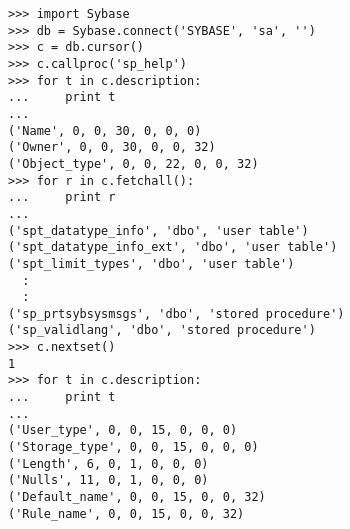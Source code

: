 \begin{verbatim}
>>> import Sybase
>>> db = Sybase.connect('SYBASE', 'sa', '')
>>> c = db.cursor()
>>> c.callproc('sp_help')
>>> for t in c.description:
...     print t
... 
('Name', 0, 0, 30, 0, 0, 0)
('Owner', 0, 0, 30, 0, 0, 32)
('Object_type', 0, 0, 22, 0, 0, 32)
>>> for r in c.fetchall():
...     print r
... 
('spt_datatype_info', 'dbo', 'user table')
('spt_datatype_info_ext', 'dbo', 'user table')
('spt_limit_types', 'dbo', 'user table')
  :
  :
('sp_prtsybsysmsgs', 'dbo', 'stored procedure')
('sp_validlang', 'dbo', 'stored procedure')
>>> c.nextset()
1
>>> for t in c.description:
...     print t
... 
('User_type', 0, 0, 15, 0, 0, 0)
('Storage_type', 0, 0, 15, 0, 0, 0)
('Length', 6, 0, 1, 0, 0, 0)
('Nulls', 11, 0, 1, 0, 0, 0)
('Default_name', 0, 0, 15, 0, 0, 32)
('Rule_name', 0, 0, 15, 0, 0, 32)
\end{verbatim}
